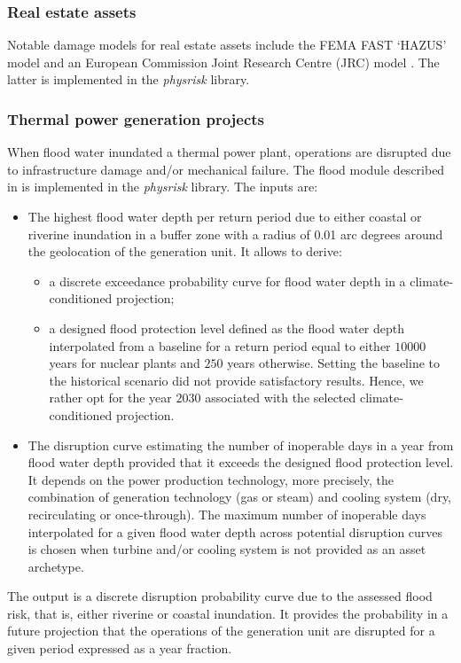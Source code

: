 \documentclass[a4paper,11pt]{extarticle} %
\theoremstyle{definition}
\begin{document}
\subsubsection{Real estate assets}
Notable damage models for real estate assets include the FEMA FAST `HAZUS' model \cite{ScawthornEtAl:2006} and an European Commission Joint Research Centre (JRC) model \cite{HuizingaEtAl:2017}. The latter is implemented in the \emph{physrisk} library.

\subsubsection{Thermal power generation projects}
When flood water inundated a thermal power plant, operations are disrupted due to infrastructure damage and/or mechanical failure. The flood module described in \cite{LuoEtAl:2021,LuoEtAl:2023} is implemented in the \emph{physrisk} library. The inputs are:
\begin{itemize}
\item The highest flood water depth per return period due to either coastal or riverine inundation in a buffer zone with a radius of 0.01 arc degrees around the geolocation of the generation unit. It allows to derive:
\begin{itemize}
\item a discrete exceedance probability curve for flood water depth in a climate-conditioned projection;
\item a designed flood protection level defined as the flood water depth interpolated from a baseline for a return period equal to either $10000$ years for nuclear plants and $250$ years otherwise. Setting the baseline to the historical scenario did not provide satisfactory results. Hence, we rather opt for the year $2030$ associated with the selected climate-conditioned projection.
\end{itemize}
\item The disruption curve estimating the number of inoperable days in a year from flood water depth provided that it exceeds the designed flood protection level. It depends on the power production technology, more precisely, the combination of generation technology (gas or steam) and cooling system (dry, recirculating or once-through). The maximum number of inoperable days interpolated for a given flood water depth across potential disruption curves is chosen when turbine and/or cooling system is not provided as an asset archetype.
\end{itemize}
The output is a discrete disruption probability curve due to the assessed flood risk, that is, either riverine or coastal inundation. It provides the probability in a future projection that the operations of the generation unit are disrupted for a given period expressed as a year fraction.
\end{document}
